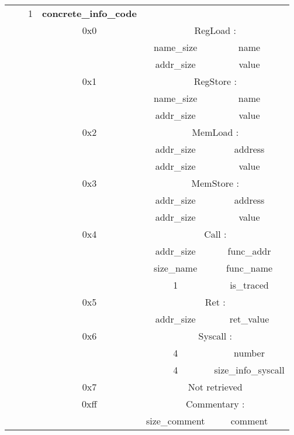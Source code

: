 \documentclass{report}
\begin{document}
\begin{tabular}{| * {7} {c|} }
						& \multicolumn{2}{|c|}{} & 1 & \bf concrete\_info\_code &  \multicolumn{2}{|c|}{} \\ \cline{4-7}
						& \multicolumn{3}{|c|}{} & 0x0 & \multicolumn{2}{|c|}{RegLoad :} \\ \cline{5-7}
						& \multicolumn{4}{|c|}{} & name\_size & name \\ \cline{6-7}
						& \multicolumn{4}{|c|}{} & addr\_size & value \\ \cline{5-7}
						& \multicolumn{3}{|c|}{} & 0x1 & \multicolumn{2}{|c|}{RegStore :} \\ \cline{5-7}
						& \multicolumn{4}{|c|}{} & name\_size & name \\ \cline{6-7}
						& \multicolumn{4}{|c|}{} & addr\_size & value \\ \cline{5-7}
						& \multicolumn{3}{|c|}{} & 0x2 & \multicolumn{2}{|c|}{MemLoad :} \\ \cline{5-7}
						& \multicolumn{4}{|c|}{} & addr\_size & address \\ \cline{6-7}
						& \multicolumn{4}{|c|}{} & addr\_size & value \\ \cline{5-7}
						& \multicolumn{3}{|c|}{} & 0x3 & \multicolumn{2}{|c|}{MemStore :} \\ \cline{5-7}
						& \multicolumn{4}{|c|}{} & addr\_size & address \\ \cline{6-7}
						& \multicolumn{4}{|c|}{} & addr\_size & value \\ \cline{5-7}
						& \multicolumn{3}{|c|}{} & 0x4 & \multicolumn{2}{|c|}{Call :} \\ \cline{5-7}
						& \multicolumn{4}{|c|}{} & addr\_size & func\_addr \\ \cline{6-7}
						& \multicolumn{4}{|c|}{} & size\_name & func\_name \\ \cline{6-7}
						& \multicolumn{4}{|c|}{} & 1 & is\_traced \\ \cline{5-7}
						& \multicolumn{3}{|c|}{} & 0x5 & \multicolumn{2}{|c|}{Ret :} \\ \cline{5-7}
						& \multicolumn{4}{|c|}{} & addr\_size & ret\_value \\ \cline{5-7}
						& \multicolumn{3}{|c|}{} & 0x6 & \multicolumn{2}{|c|}{Syscall :} \\ \cline{5-7}
						& \multicolumn{4}{|c|}{} & 4 & number \\ \cline{6-7}
						& \multicolumn{4}{|c|}{} & 4 & size\_info\_syscall \\ \cline{5-7}
						& \multicolumn{3}{|c|}{} & 0x7 & \multicolumn{2}{|c|}{Not retrieved} \\ \cline{5-7}
						& \multicolumn{3}{|c|}{} & 0xff & \multicolumn{2}{|c|}{Commentary :} \\ \cline{5-7}
						& \multicolumn{4}{|c|}{} & size\_comment & comment \\ \hline

			

\end{tabular}
\end{document}
